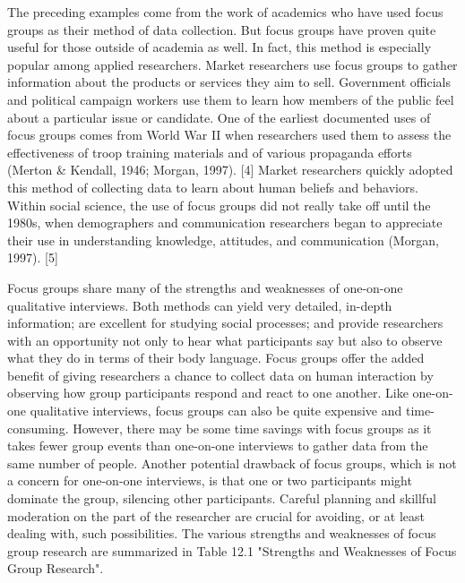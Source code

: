 The preceding examples come from the work of academics who have used focus groups as their method of data collection. But focus groups have proven quite useful for those outside of academia as well. In fact, this method is especially popular among applied researchers. Market researchers use focus groups to gather information about the products or services they aim to sell. Government officials and political campaign workers use them to learn how members of the public feel about a particular issue or candidate. One of the earliest documented uses of focus groups comes from World War II when researchers used them to assess the effectiveness of troop training materials and of various propaganda efforts (Merton \& Kendall, 1946; Morgan, 1997). [4] Market researchers quickly adopted this method of collecting data to learn about human beliefs and behaviors. Within social science, the use of focus groups did not really take off until the 1980s, when demographers and communication researchers began to appreciate their use in understanding knowledge, attitudes, and communication (Morgan, 1997). [5]

Focus groups share many of the strengths and weaknesses of one-on-one qualitative interviews. Both methods can yield very detailed, in-depth information; are excellent for studying social processes; and provide researchers with an opportunity not only to hear what participants say but also to observe what they do in terms of their body language. Focus groups offer the added benefit of giving researchers a chance to collect data on human interaction by observing how group participants respond and react to one another. Like one-on-one qualitative interviews, focus groups can also be quite expensive and time-consuming. However, there may be some time savings with focus groups as it takes fewer group events than one-on-one interviews to gather data from the same number of people. Another potential drawback of focus groups, which is not a concern for one-on-one interviews, is that one or two participants might dominate the group, silencing other participants. Careful planning and skillful moderation on the part of the researcher are crucial for avoiding, or at least dealing with, such possibilities. The various strengths and weaknesses of focus group research are summarized in Table 12.1 "Strengths and Weaknesses of Focus Group Research".

